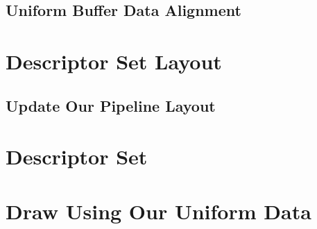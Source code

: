 \subsection{Uniform Buffer Data Alignment}

\section{Descriptor Set Layout}

\subsection{Update Our Pipeline Layout}

\section{Descriptor Set}

\section{Draw Using Our Uniform Data}
